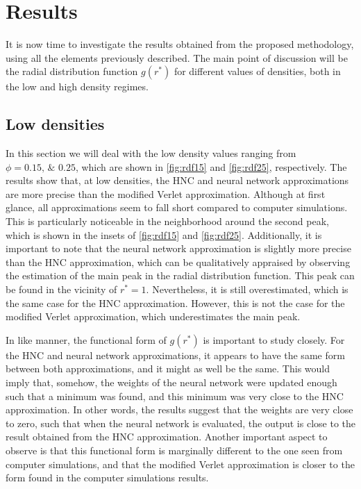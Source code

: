 \section{Results}
It is now time to investigate the results obtained from the proposed methodology, using all the elements previously described.
The main point of discussion will be the radial distribution
function \textemdash $g(r^*)$ \textemdash for different values of densities, both in the
low and high density regimes.

\subsection{Low densities}
In this section we will deal with the low 
density values ranging from $\phi=\numlist[list-pair-separator={\enspace\text{to}\enspace}]{0.15;0.25}$, which are shown in \autoref{fig:rdf15} and \autoref{fig:rdf25}, respectively.
The results show that, at low densities, the HNC and neural network approximations are
more precise than the modified Verlet approximation. Although at first glance, all
approximations seem to fall short compared to computer simulations. This is particularly 
noticeable in the neighborhood around the second peak, which is shown in the insets 
of \autoref{fig:rdf15} and \autoref{fig:rdf25}.
Additionally, it is important to note that the neural network approximation is slightly
more precise than the HNC approximation, which can be qualitatively appraised by observing 
the estimation of the main peak in the radial distribution function. This peak can be found 
in the vicinity of $r^* = 1$. Nevertheless, it is still overestimated, which is the 
same case for the HNC approximation. However, this is not the case for the modified Verlet 
approximation, which underestimates the main peak.

In like manner, the functional form of $g(r^*)$ is important to study closely.
For the HNC and neural network approximations, it appears to have the same form between 
both approximations, and it might as well be the same.
This would imply that, somehow, the weights of the neural network
were updated enough such that a minimum was found, and this minimum was very close to the
HNC approximation. In other words, the results suggest that the weights are very close to
zero, such that when the neural network is evaluated, the output is close to the
result obtained from the HNC approximation.
Another important aspect to observe is that this functional form is marginally different
to the one seen from computer simulations, and that the modified Verlet approximation is 
closer to the form found in the computer simulations results.

